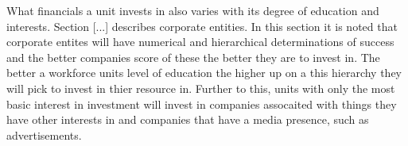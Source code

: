 What financials a unit invests in also varies with its degree of education and interests. Section [...] describes corporate entities. In this section it is noted that corporate entites will have numerical and hierarchical determinations of success and the better companies score of these the better they are to invest in. The better a workforce units level of education the higher up on a this hierarchy they will pick to invest in thier resource in. Further to this, units with only the most basic interest in investment will invest in companies assocaited with things they have other interests in and companies that have a media presence, such as advertisements.

%
%
